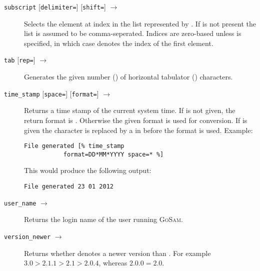 \documentclass[11pt,a4paper]{refrep}
\newcommand{\golem}{\textsc{GoSam}\xspace}
\begin{document}
\begin{description}
\item[\texttt{subscript}  
   {[\texttt{delimiter=}]}
   {[\texttt{shift=}]} $\to$ ]
   Selects the element at index  in the list
   represented by . If  is not present
   the list is assumed to be comma-seperated. Indices are zero-based
   unless  is specified, in which case 
   denotes the index of the first element.
\item[\texttt{tab} {[\texttt{rep=}]} $\to$ ]
   Generates the given
   number () of horizontal tabulator (\lit{\\t}) characters.
\item[\texttt{time\_stamp} {[\texttt{space=}]}
   {[\texttt{format=}]} $\to$ ]
   Returns a time stamp of the current system time. If  is
   not given, the return format is . Otherwise the given
   format is used for conversion. If  is given the
   character  is replaced by a \lit{ } in  before
   the format is used. Example:
\begin{lstlisting}
File generated [% time_stamp 
           format=DD*MM*YYYY space=* %]
\end{lstlisting}
   This would produce the following output:
\begin{lstlisting}
File generated 23 01 2012
\end{lstlisting}
\item[\texttt{user\_name} $\to$ ]
   Returns the login name of the user running \golem{}.
\item[\texttt{version\_newer}  
   $\to$ ]
   Returns whether  denotes a newer version than
   . For example $3.0>2.1.1>2.1>2.0.4$, whereas
   $2.0.0=2.0$.
\end{description}
\end{document}
